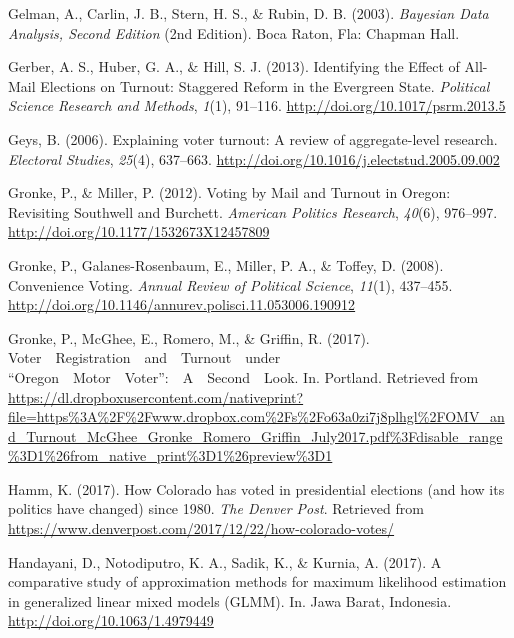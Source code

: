 \documentclass[12pt,twoside]{reedthesis}
\begin{document}
  \hypertarget{ref-gelman_bayesian_2003}{}
  Gelman, A., Carlin, J. B., Stern, H. S., \& Rubin, D. B. (2003).
  \emph{Bayesian Data Analysis, Second Edition} (2nd Edition). Boca Raton,
  Fla: Chapman Hall.
  
  \hypertarget{ref-gerber_identifying_2013}{}
  Gerber, A. S., Huber, G. A., \& Hill, S. J. (2013). Identifying the
  Effect of All-Mail Elections on Turnout: Staggered Reform in the
  Evergreen State. \emph{Political Science Research and Methods},
  \emph{1}(1), 91--116. \url{http://doi.org/10.1017/psrm.2013.5}
  
  \hypertarget{ref-geys_explaining_2006}{}
  Geys, B. (2006). Explaining voter turnout: A review of aggregate-level
  research. \emph{Electoral Studies}, \emph{25}(4), 637--663.
  \url{http://doi.org/10.1016/j.electstud.2005.09.002}
  
  \hypertarget{ref-gronke_voting_2012}{}
  Gronke, P., \& Miller, P. (2012). Voting by Mail and Turnout in Oregon:
  Revisiting Southwell and Burchett. \emph{American Politics Research},
  \emph{40}(6), 976--997. \url{http://doi.org/10.1177/1532673X12457809}
  
  \hypertarget{ref-gronke_convenience_2008}{}
  Gronke, P., Galanes-Rosenbaum, E., Miller, P. A., \& Toffey, D. (2008).
  Convenience Voting. \emph{Annual Review of Political Science},
  \emph{11}(1), 437--455.
  \url{http://doi.org/10.1146/annurev.polisci.11.053006.190912}
  
  \hypertarget{ref-gronke_voter_2017}{}
  Gronke, P., McGhee, E., Romero, M., \& Griffin, R. (2017).
  Voter~~Registration~~and~~Turnout~~under
  ``Oregon~~Motor~~Voter'':~~A~~Second~~Look. In. Portland. Retrieved from
  \url{https://dl.dropboxusercontent.com/nativeprint?file=https\%3A\%2F\%2Fwww.dropbox.com\%2Fs\%2Fo63a0zi7j8plhgl\%2FOMV_and_Turnout_McGhee_Gronke_Romero_Griffin_July2017.pdf\%3Fdisable_range\%3D1\%26from_native_print\%3D1\%26preview\%3D1}
  
  \hypertarget{ref-hamm_how_2017}{}
  Hamm, K. (2017). How Colorado has voted in presidential elections (and
  how its politics have changed) since 1980. \emph{The Denver Post}.
  Retrieved from
  \url{https://www.denverpost.com/2017/12/22/how-colorado-votes/}
  
  \hypertarget{ref-handayani_comparative_2017}{}
  Handayani, D., Notodiputro, K. A., Sadik, K., \& Kurnia, A. (2017). A
  comparative study of approximation methods for maximum likelihood
  estimation in generalized linear mixed models (GLMM). In. Jawa Barat,
  Indonesia. \url{http://doi.org/10.1063/1.4979449}
  
\end{document}
